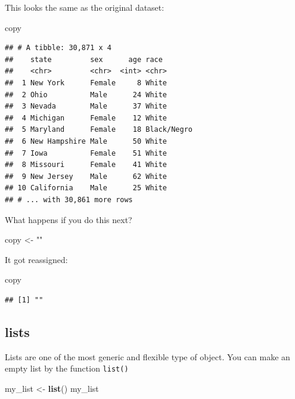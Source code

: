 \documentclass[]{book}
\newenvironment{Shaded}{\begin{snugshade}}{\end{snugshade}}
\newcommand{\KeywordTok}[1]{\textcolor[rgb]{0.13,0.29,0.53}{\textbf{#1}}}
\newcommand{\NormalTok}[1]{#1}
\newcommand{\StringTok}[1]{\textcolor[rgb]{0.31,0.60,0.02}{#1}}
\theoremstyle{definition}
\theoremstyle{definition}
\theoremstyle{definition}
\theoremstyle{remark}
\begin{document}
This looks the same as the original dataset:

\begin{Shaded}
\begin{Highlighting}[]
\NormalTok{copy}
\end{Highlighting}
\end{Shaded}

\begin{verbatim}
## # A tibble: 30,871 x 4
##    state         sex      age race       
##    <chr>         <chr>  <int> <chr>      
##  1 New York      Female     8 White      
##  2 Ohio          Male      24 White      
##  3 Nevada        Male      37 White      
##  4 Michigan      Female    12 White      
##  5 Maryland      Female    18 Black/Negro
##  6 New Hampshire Male      50 White      
##  7 Iowa          Female    51 White      
##  8 Missouri      Female    41 White      
##  9 New Jersey    Male      62 White      
## 10 California    Male      25 White      
## # ... with 30,861 more rows
\end{verbatim}

What happens if you do this next?

\begin{Shaded}
\begin{Highlighting}[]
\NormalTok{copy <-}\StringTok{ ""}
\end{Highlighting}
\end{Shaded}

It got reassigned:

\begin{Shaded}
\begin{Highlighting}[]
\NormalTok{copy}
\end{Highlighting}
\end{Shaded}

\begin{verbatim}
## [1] ""
\end{verbatim}

\hypertarget{lists}{%
\subsection{lists}\label{lists}}

Lists are one of the most generic and flexible type of object. You can make an empty list by the function \texttt{list()}

\begin{Shaded}
\begin{Highlighting}[]
\NormalTok{my_list <-}\StringTok{ }\KeywordTok{list}\NormalTok{()}
\NormalTok{my_list}
\end{Highlighting}
\end{Shaded}
\end{document}
